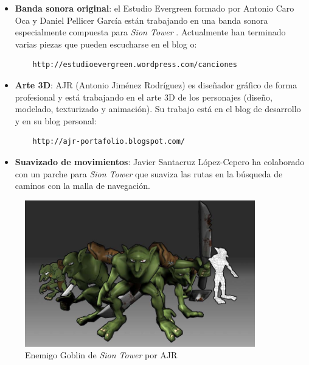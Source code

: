 \documentclass[16pt,spanish]{article}
\def \juego{\emph {Sion Tower} }
\begin{document}
\begin{itemize}
    \item \textbf{Banda sonora original}: el Estudio Evergreen formado por
    Antonio Caro Oca y Daniel Pellicer García están trabajando en una banda
    sonora especialmente compuesta para \juego. Actualmente han terminado
    varias piezas que pueden escucharse en el blog o:
    \begin{verbatim}
    http://estudioevergreen.wordpress.com/canciones
    \end{verbatim}
    \item \textbf{Arte 3D}: AJR (Antonio Jiménez Rodríguez) es diseñador
    gráfico de forma profesional y está trabajando en el arte 3D de los
    personajes (diseño, modelado, texturizado y animación). Su trabajo está
    en el blog de desarrollo y en su blog personal:
    \begin{verbatim}
    http://ajr-portafolio.blogspot.com/
    \end{verbatim}
    \item \textbf{Suavizado de movimientos}: Javier Santacruz López-Cepero
    ha colaborado con un parche para \juego que suaviza las rutas en la
    búsqueda de caminos con la malla de navegación.
\end{itemize}

\begin{figure}[H]
    \centering
        \includegraphics[width=10cm]{img/collage-goblin.jpg} 
    \caption{Enemigo Goblin de \juego por AJR}
    \label{img:protagonista}
\end{figure}
\end{document}
